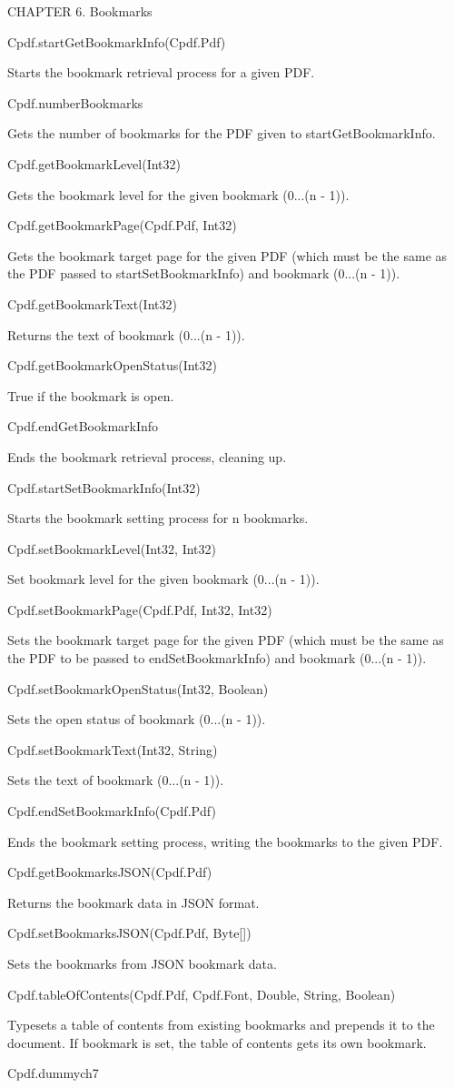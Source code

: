 CHAPTER 6. Bookmarks

Cpdf.startGetBookmarkInfo(Cpdf.Pdf)

Starts the bookmark retrieval process for a
given PDF.

Cpdf.numberBookmarks

Gets the number of bookmarks for the PDF given to
startGetBookmarkInfo.

Cpdf.getBookmarkLevel(Int32)

Gets the bookmark level for the given bookmark
(0...(n - 1)).

Cpdf.getBookmarkPage(Cpdf.Pdf, Int32)

Gets the bookmark target page for the given PDF
(which must be the same as the PDF passed to startSetBookmarkInfo)
and bookmark (0...(n - 1)).

Cpdf.getBookmarkText(Int32)

Returns the text of bookmark (0...(n - 1)).

Cpdf.getBookmarkOpenStatus(Int32)

True if the bookmark is open.

Cpdf.endGetBookmarkInfo

Ends the bookmark retrieval process, cleaning up.

Cpdf.startSetBookmarkInfo(Int32)

Starts the bookmark setting process for n
bookmarks.

Cpdf.setBookmarkLevel(Int32, Int32)

Set bookmark level for the given bookmark
(0...(n - 1)).

Cpdf.setBookmarkPage(Cpdf.Pdf, Int32, Int32)

Sets the bookmark target
page for the given PDF (which must be the same as the PDF to be passed to
endSetBookmarkInfo) and bookmark (0...(n - 1)).

Cpdf.setBookmarkOpenStatus(Int32, Boolean)

Sets the open status of bookmark (0...(n - 1)).

Cpdf.setBookmarkText(Int32, String)

Sets the text of bookmark (0...(n - 1)).

Cpdf.endSetBookmarkInfo(Cpdf.Pdf)

Ends the bookmark setting process, writing the
bookmarks to the given PDF.

Cpdf.getBookmarksJSON(Cpdf.Pdf)

Returns the bookmark data in JSON format.

Cpdf.setBookmarksJSON(Cpdf.Pdf, Byte[])

Sets the bookmarks from JSON bookmark data.

Cpdf.tableOfContents(Cpdf.Pdf, Cpdf.Font, Double, String, Boolean)

Typesets a table
of contents from existing bookmarks and prepends it to the document. If
bookmark is set, the table of contents gets its own bookmark.

Cpdf.dummych7

